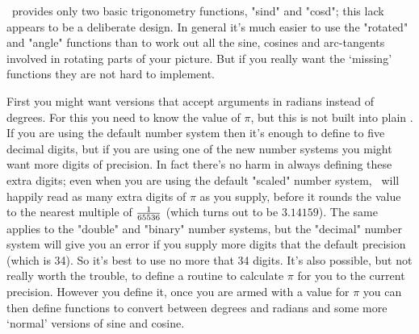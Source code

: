 \documentclass[a4paper,landscape]{article}
\begin{document}
\MP\ provides only two basic trigonometry functions, "sind" and "cosd";  this lack
appears to be a deliberate design.  In general it's much easier to use the "rotated"
and "angle" functions than to work out all the sine, cosines and arc-tangents
involved in rotating parts of your picture.  But if you really want the `missing'
functions they are not hard to implement.

First you might want versions that accept arguments in radians instead of degrees.
For this you need to know the value of $\pi$, but this is not built into plain \MP.
If you are using the default number system then it's enough to define to five
decimal digits,%
but if you are using one of the new number systems you might want more digits of
precision.  In fact there's no harm in always defining these extra digits; even when
you are using the default "scaled" number system, \MP\ will happily read as many
extra digits of $\pi$ as you supply, before it rounds the value to the nearest
multiple of $1\over65536$ (which turns out to be $3.14159$). The same applies to the
"double" and "binary" number systems, but the "decimal" number system will give you
an error if you supply more digits that the default precision (which is 34).  So
it's best to use no more that 34 digits.  It's also possible, but not really worth
the trouble, to define a routine to calculate $\pi$ for you to the current
precision.  However you define it, once you are armed with a value for $\pi$ you can
then define functions to convert between degrees and radians and some more `normal'
versions of sine and cosine.
\end{document}
